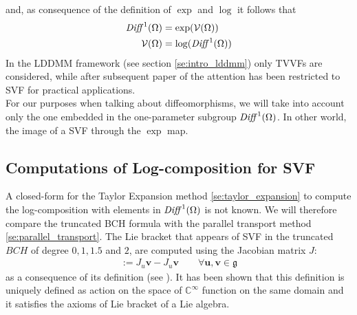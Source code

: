 and, as consequence of the definition of $\exp$ and $\log$ it follows that
\begin{align*}
\text{\emph{Diff}}^{1}(\Omega) &= \exp( \mathcal{V}(\Omega))\\
\mathcal{V}(\Omega) &= \log(\text{\emph{Diff}}^{1}(\Omega))
\end{align*}
In the LDDMM framework (see section \ref{se:intro_lddmm}) only TVVFs are considered, while after subsequent paper of \cite{arsigny2006log} the attention has been restricted to SVF for practical applications.\\
For our purposes when talking about diffeomorphisms, we will take into account only the one embedded in the one-parameter subgroup $\text{\emph{Diff}}^{1}(\Omega)$. In other world, the image of a SVF through the $\exp$ map. 

\subsection{Computations of Log-composition for SVF}
A closed-form for the Taylor Expansion method \ref{se:taylor_expansion} to compute the log-composition with elements in $\text{\emph{Diff}}^{1}(\Omega)$ is not known. We will therefore compare the truncated BCH formula with the parallel transport method \ref{se:parallel_transport}. 
The Lie bracket that appears of SVF in the truncated $BCH$ of degree $0,1,1.5$ and $2$, are computed using the Jacobian matrix $J$:
\begin{align}
[\mathbf{u},\mathbf{v}] :=J_{u}\mathbf{v} - J_{u}\mathbf{v}  
\qquad
\forall \mathbf{u},\mathbf{v} \in \mathfrak{g}
\end{align}
as a consequence of its definition (see \cite{lee2012introduction}).
It has been shown that this definition is uniquely defined as action on the space of $\mathbb{C}^{\infty}$ function on the same domain and it satisfies the axioms of Lie bracket of a Lie algebra.\\

